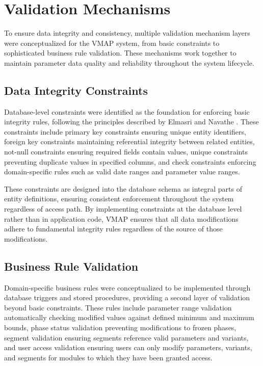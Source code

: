 \section{Validation Mechanisms}
\label{sec:validation-mechanisms}

To ensure data integrity and consistency, multiple validation mechanism layers were conceptualized for the \ac{VMAP} system, from basic constraints to sophisticated business rule validation. These mechanisms work together to maintain parameter data quality and reliability throughout the system lifecycle.

\subsection{Data Integrity Constraints}
\label{subsec:data-integrity-constraints}

Database-level constraints were identified as the foundation for enforcing basic integrity rules, following the principles described by Elmasri and Navathe \cite{elmasri2015fundamentals}. These constraints include primary key constraints ensuring unique entity identifiers, foreign key constraints maintaining referential integrity between related entities, not-null constraints ensuring required fields contain values, unique constraints preventing duplicate values in specified columns, and check constraints enforcing domain-specific rules such as valid date ranges and parameter value ranges.

These constraints are designed into the database schema as integral parts of entity definitions, ensuring consistent enforcement throughout the system regardless of access path. By implementing constraints at the database level rather than in application code, \ac{VMAP} ensures that all data modifications adhere to fundamental integrity rules regardless of the source of those modifications.

\subsection{Business Rule Validation}
\label{subsec:business-rule-validation}

Domain-specific business rules were conceptualized to be implemented through database triggers and stored procedures, providing a second layer of validation beyond basic constraints. These rules include parameter range validation automatically checking modified values against defined minimum and maximum bounds, phase status validation preventing modifications to frozen phases, segment validation ensuring segments reference valid parameters and variants, and user access validation ensuring users can only modify parameters, variants, and segments for modules to which they have been granted access.

